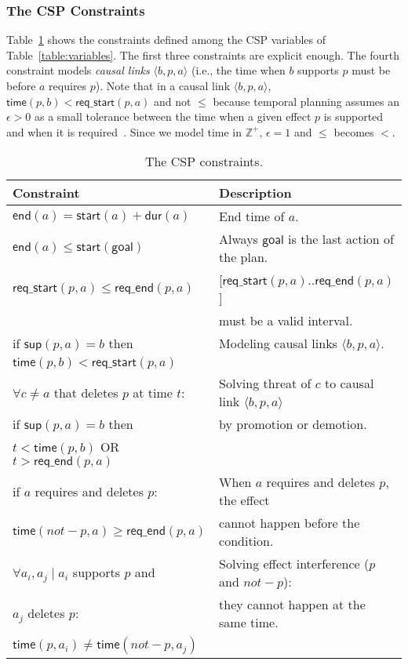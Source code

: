 \documentclass{ecai}
\newcommand{\tup}[1]{{\langle #1 \rangle}}
\newcommand{\dur}{\mathsf{dur}}    %
\newcommand{\start}{\mathsf{start}}%
\newcommand{\en}{\mathsf{end}}     %
\newcommand{\supp}{\mathsf{sup}}   %
\newcommand{\tim}{\mathsf{time}}   %
\newcommand{\reqs}{\mathsf{req\_{start}}} %
\newcommand{\reqe}{\mathsf{req\_{end}}}   %
\newcommand{\goal}{\mathsf{goal}}  %
\begin{document}
\subsubsection{The CSP Constraints}
Table~\ref{table:constraints} shows the constraints defined among the CSP variables of Table~\ref{table:variables}. The first three constraints are explicit enough. The fourth constraint models {\em causal links} $\tup{b,p,a}$ (i.e., the time when $b$ supports $p$ must be before $a$ requires $p$). Note that in a causal link $\tup{b,p,a}$, $\tim(p,b) < \reqs(p,a)$ and not $\leq$ because temporal planning assumes an $\epsilon > 0$ as a small tolerance between the time when a given effect $p$ is supported and when it is required~\cite{fox2003pddl2}. Since we model time in $\mathbb{Z}^+$, $\epsilon=1$ and $\leq$ becomes $<$. 

\begin{table}
\setlength\extrarowheight{2pt}    
\begin{scriptsize}
\begin{tabular}{ll}
{\bf Constraint} & {\bf Description} \\\hline

$\en(a)=\start(a)+\dur(a)$ & End time of $a$. \\

$\en(a) \leq \start(\goal)$ & Always $\goal$ is the last action of the plan. \\

$\reqs(p,a) \leq \reqe(p,a)$ & [$\reqs(p,a)..\reqe(p,a)$]\\
& must be a valid interval.\\

if $\supp(p,a)=b$ then & Modeling causal links $\tup{b,p,a}$.\\
$\tim(p,b) < \reqs(p,a)$ & \\

$\forall c \neq a$ that deletes $p$ at time $t$: & Solving threat of $c$ to causal link $\tup{b,p,a}$\\
if $\supp(p,a)=b$ then &  by promotion or demotion.\\
$t < \tim(p,b)$ OR $t > \reqe(p,a)$ & \\

if $a$ requires and deletes $p$: & When $a$ requires and deletes $p$, the effect \\
$\tim(not-p,a) \geq \reqe(p,a)$ & cannot happen before the condition.\\

$\forall a_i,a_j \mid a_i$ supports $p$ and & Solving effect interference ($p$ and $not-p$):\\
$a_j$ deletes $p$: & they cannot happen at the same time.\\
$\tim(p,a_i) \neq \tim(not-p,a_j)$ &
\end{tabular}
\end{scriptsize}
\caption{\small The CSP constraints.}
\label{table:constraints}
\end{table}
\end{document}
